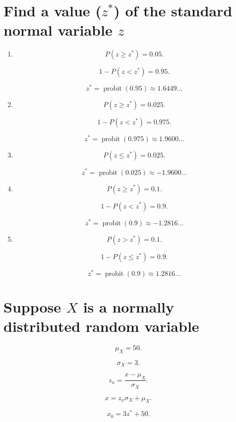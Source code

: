 \documentclass[12pt]{article}
\DeclareMathOperator{\probit}{probit}
\begin{document}
\section{Find a value ($z^*$) of the standard normal variable $z$}
\begin{enumerate}
\item
\[P(z\geq z^*)=0.05.\]

\[1-P(z<z^*)=0.95.\]

\[z^*=\probit(0.95)\approx 1.6449\dots\]
\item
\[P(z\geq z^*)=0.025.\]

\[1-P(z<z^*)=0.975.\]

\[z^*=\probit(0.975)\approx 1.9600\dots\]
\item
\[P(z\leq z^*)=0.025.\]

\[z^*=\probit(0.025)\approx -1.9600\dots\]
\item
\[P(z\geq z^*)=0.1.\]

\[1-P(z<z^*)=0.9.\]

\[z^*=\probit(0.9)\approx -1.2816\dots\]
\item
\[P(z>z^*)=0.1.\]

\[1-P(z\leq z^*)=0.9.\]

\[z^*=\probit(0.9)\approx 1.2816\dots\]
\end{enumerate}
\section{Suppose $X$ is a normally distributed random variable}
\[\mu_X=50.\]

\[\sigma_X=3.\]

\[z_x=\frac{x-\mu_X}{\sigma_X}.\]

\[x=z_x\sigma_X+\mu_X.\]

\[x_0=3z^*+50.\]
\end{document}
